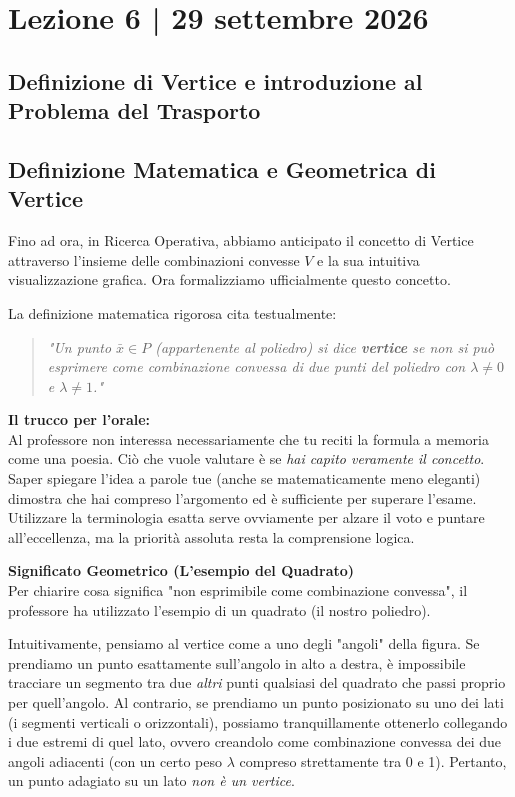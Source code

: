 \documentclass[12pt, a4paper]{article}
\begin{document}
	\section*{Lezione 6 | 29 settembre 2026}
	\subsection*{Definizione di Vertice e introduzione al Problema del Trasporto}
	
	\subsection*{Definizione Matematica e Geometrica di Vertice}
	
	Fino ad ora, in Ricerca Operativa, abbiamo anticipato il concetto di Vertice attraverso l'insieme delle combinazioni convesse $V$ e la sua intuitiva visualizzazione grafica. Ora formalizziamo ufficialmente questo concetto.
	
	La definizione matematica rigorosa cita testualmente:
	\begin{quote}
		\textit{"Un punto $\bar{x} \in P$ (appartenente al poliedro) si dice \textbf{vertice} se non si può esprimere come combinazione convessa di due punti del poliedro con $\lambda \neq 0$ e $\lambda \neq 1$."}
	\end{quote}
	
	\textbf{Il trucco per l'orale:}\\
	Al professore non interessa necessariamente che tu reciti la formula a memoria come una poesia. Ciò che vuole valutare è se \textit{hai capito veramente il concetto}. Saper spiegare l'idea a parole tue (anche se matematicamente meno eleganti) dimostra che hai compreso l'argomento ed è sufficiente per superare l'esame. Utilizzare la terminologia esatta serve ovviamente per alzare il voto e puntare all'eccellenza, ma la priorità assoluta resta la comprensione logica.
	
	\vspace{0.4cm}
	\textbf{Significato Geometrico (L'esempio del Quadrato)}\\
	Per chiarire cosa significa "non esprimibile come combinazione convessa", il professore ha utilizzato l'esempio di un quadrato (il nostro poliedro). 
	
	Intuitivamente, pensiamo al vertice come a uno degli "angoli" della figura. Se prendiamo un punto esattamente sull'angolo in alto a destra, è impossibile tracciare un segmento tra due \textit{altri} punti qualsiasi del quadrato che passi proprio per quell'angolo. 
	Al contrario, se prendiamo un punto posizionato su uno dei lati (i segmenti verticali o orizzontali), possiamo tranquillamente ottenerlo collegando i due estremi di quel lato, ovvero creandolo come combinazione convessa dei due angoli adiacenti (con un certo peso $\lambda$ compreso strettamente tra 0 e 1). Pertanto, un punto adagiato su un lato \textit{non è un vertice}.
	
\end{document}
